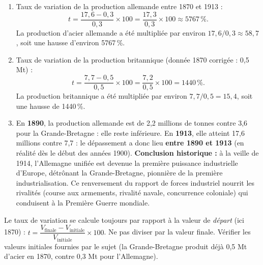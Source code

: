 \documentclass[11pt]{article}
\begin{document}
\begin{corrige}
\begin{enumerate}
\item Taux de variation de la production allemande entre 1870 et 1913 :
\[ t = \frac{17,6 - 0,3}{0,3} \times 100 = \frac{17,3}{0,3} \times 100 \approx \num{5767}\,\%. \]
La production d'acier allemande a été multipliée par environ $17,6 / 0,3 \approx 58,7$, soit une hausse d'environ \num{5767}\,\%.
\item Taux de variation de la production britannique (donnée 1870 corrigée : 0,5 Mt) :
\[ t = \frac{7,7 - 0,5}{0,5} \times 100 = \frac{7,2}{0,5} \times 100 = \num{1440}\,\%. \]
La production britannique a été multipliée par environ $7,7 / 0,5 = 15,4$, soit une hausse de \num{1440}\,\%.
\item En \textbf{1890}, la production allemande est de 2,2 millions de tonnes contre 3,6 pour la Grande-Bretagne : elle reste inférieure. En \textbf{1913}, elle atteint 17,6 millions contre 7,7 : le dépassement a donc lieu \textbf{entre 1890 et 1913} (en réalité dès le début des années 1900). \textbf{Conclusion historique :} à la veille de 1914, l'Allemagne unifiée est devenue la première puissance industrielle d'Europe, détrônant la Grande-Bretagne, pionnière de la première industrialisation. Ce renversement du rapport de forces industriel nourrit les rivalités (course aux armements, rivalité navale, concurrence coloniale) qui conduisent à la Première Guerre mondiale.
\end{enumerate}
\begin{attention}
Le taux de variation se calcule toujours par rapport à la valeur de \emph{départ} (ici 1870) : $t = \dfrac{V_{\text{finale}} - V_{\text{initiale}}}{V_{\text{initiale}}} \times 100$. Ne pas diviser par la valeur finale. Vérifier les valeurs initiales fournies par le sujet (la Grande-Bretagne produit déjà 0,5 Mt d'acier en 1870, contre 0,3 Mt pour l'Allemagne).
\end{attention}
\end{corrige}
\end{document}
